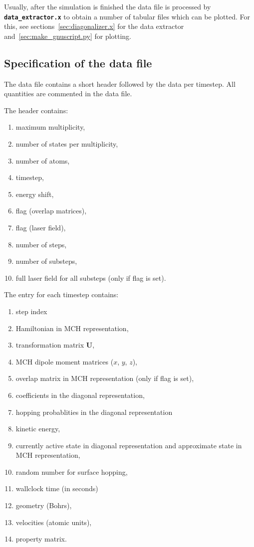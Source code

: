 \documentclass[a4paper,11pt,DIV=15,openany,twoside=false]{scrbook}
\newcommand{\ttt}[1]{\textbf{\texttt{#1}}}
\newcommand{\VEC}[1]{\ensuremath{\mathbf{#1}}}
\begin{document}
Usually, after the simulation is finished the data file is processed by \ttt{data\_extractor.x} to obtain a number of tabular files which can be plotted. For this, see sections~\ref{sec:diagonalizer.x} for the data extractor and~\ref{sec:make_gnuscript.py} for plotting.

\subsection{Specification of the data file}

The data file contains a short header followed by the data per timestep. All quantities are commented in the data file.

The header contains:
\begin{enumerate}
  \item maximum multiplicity,
  \item number of states per multiplicity,
  \item number of atoms,
  \item timestep,
  \item energy shift,
  \item flag (overlap matrices),
  \item flag (laser field),
  \item number of steps,
  \item number of substeps,
  \item full laser field for all substeps (only if flag is set).
\end{enumerate}

The entry for each timestep contains:
\begin{enumerate}
  \item step index
  \item Hamiltonian in MCH representation,
  \item transformation matrix $\VEC{U}$,
  \item MCH dipole moment matrices ($x$, $y$, $z$),
  \item overlap matrix in MCH representation (only if flag is set),
  \item coefficients in the diagonal representation,
  \item hopping probablities in the diagonal representation
  \item kinetic energy,
  \item currently active state in diagonal representation and approximate state in MCH representation,
  \item random number for surface hopping,
  \item wallclock time (in seconds)
  \item geometry (Bohrs),
  \item velocities (atomic units),
  \item property matrix.
\end{enumerate}
\end{document}
